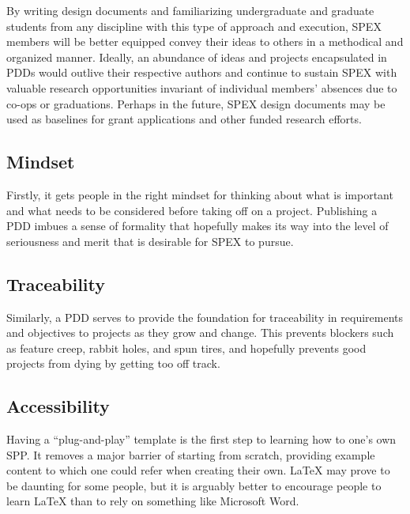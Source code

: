 \documentclass[conference]{IEEEtran} %
\begin{document}
By writing design documents and familiarizing undergraduate and graduate students from any discipline with this type of approach and execution, SPEX members will be better equipped convey their ideas to others in a methodical and organized manner.
Ideally, an abundance of ideas and projects encapsulated in PDDs would outlive their respective authors and continue to sustain SPEX with valuable research opportunities invariant of individual members' absences due to co-ops or graduations.
Perhaps in the future, SPEX design documents may be used as baselines for grant applications and other funded research efforts.



\subsection{Mindset}
\label{subsec:mindset}
Firstly, it gets people in the right mindset for thinking about what is important and what needs to be considered before taking off on a project.
Publishing a PDD imbues a sense of formality that hopefully makes its way into the level of seriousness and merit that is desirable for SPEX to pursue.

\subsection{Traceability}
\label{subsec:traceability}
Similarly, a PDD serves to provide the foundation for traceability in requirements and objectives to projects as they grow and change.
This prevents blockers such as feature creep, rabbit holes, and spun tires, and hopefully prevents good projects from dying by getting too off track.

\subsection{Accessibility}
\label{subsec:plug-n-play}

Having a ``plug-and-play'' template is the first step to learning how to one's own SPP\@.
It removes a major barrier of starting from scratch, providing example content to which one could refer when creating their own.
\LaTeX{} may prove to be daunting for some people, but it is arguably better to encourage people to learn LaTeX than to rely on something like Microsoft Word.
\end{document}
